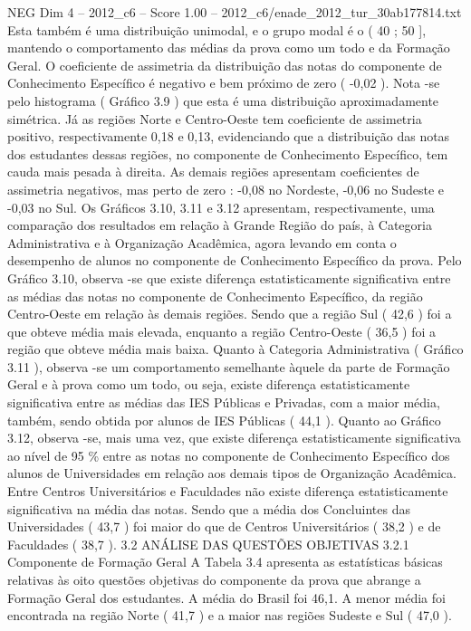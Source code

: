 \begin{textsample}{NEG Dim 4 – 2012\_c6 – Score 1.00 – 2012\_c6/enade\_2012\_tur\_30ab177814.txt}
Esta também é uma distribuição unimodal, e o grupo modal é o ( 40 ; 50 ], mantendo o comportamento das médias da prova como um todo e da Formação Geral.
O coeficiente de assimetria da distribuição das notas do componente de Conhecimento Específico é negativo e bem próximo de zero ( -0,02 ).
Nota -se pelo histograma ( Gráfico 3.9 ) que esta é uma distribuição aproximadamente simétrica.
Já as regiões Norte e Centro-Oeste tem coeficiente de assimetria positivo, respectivamente 0,18 e 0,13, evidenciando que a distribuição das notas dos estudantes dessas regiões, no componente de Conhecimento Específico, tem cauda mais pesada à direita.
As demais regiões apresentam coeficientes de assimetria negativos, mas perto de zero : -0,08 no Nordeste, -0,06 no Sudeste e -0,03 no Sul.
Os Gráficos 3.10, 3.11 e 3.12 apresentam, respectivamente, uma comparação dos resultados em relação à Grande Região do país, à Categoria Administrativa e à Organização Acadêmica, agora levando em conta o desempenho de alunos no componente de Conhecimento Específico da prova.
Pelo Gráfico 3.10, observa -se que existe diferença estatisticamente significativa entre as médias das notas no componente de Conhecimento Específico, da região Centro-Oeste em relação às demais regiões.
Sendo que a região Sul ( 42,6 ) foi a que obteve média mais elevada, enquanto a região Centro-Oeste ( 36,5 ) foi a região que obteve média mais baixa.
Quanto à Categoria Administrativa ( Gráfico 3.11 ), observa -se um comportamento semelhante àquele da parte de Formação Geral e à prova como um todo, ou seja, existe diferença estatisticamente significativa entre as médias das IES Públicas e Privadas, com a maior média, também, sendo obtida por alunos de IES Públicas ( 44,1 ).
Quanto ao Gráfico 3.12, observa -se, mais uma vez, que existe diferença estatisticamente significativa ao nível de 95 \% entre as notas no componente de Conhecimento Específico dos alunos de Universidades em relação aos demais tipos de Organização Acadêmica.
Entre Centros Universitários e Faculdades não existe diferença estatisticamente significativa na média das notas.
Sendo que a média dos Concluintes das Universidades ( 43,7 ) foi maior do que de Centros Universitários ( 38,2 ) e de Faculdades ( 38,7 ). 3.2 ANÁLISE DAS QUESTÕES OBJETIVAS 3.2.1 Componente de Formação Geral A Tabela 3.4 apresenta as estatísticas básicas relativas às oito questões objetivas do componente da prova que abrange a Formação Geral dos estudantes.
A média do Brasil foi 46,1.
A menor média foi encontrada na região Norte ( 41,7 ) e a maior nas regiões Sudeste e Sul ( 47,0 ).

\end{textsample}
